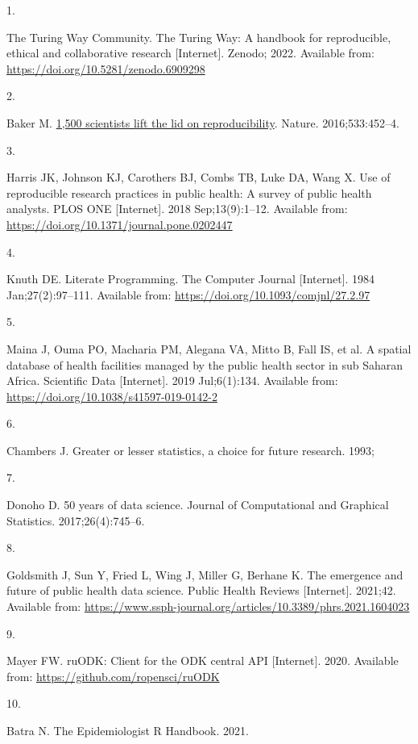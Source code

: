 \documentclass[
  letterpaper,
  DIV=11,
  numbers=noendperiod]{scrreprt}
\newlength{\cslhangindent}
\newlength{\csllabelwidth}
\newlength{\cslentryspacingunit} %
\newenvironment{CSLReferences}[2] %
 {%
  \setlength{\parindent}{0pt}
  \ifodd #1
  \let\oldpar\par
  \def\par{\hangindent=\cslhangindent\oldpar}
  \fi
  \setlength{\parskip}{#2\cslentryspacingunit}
 }%
 {}
\newcommand{\CSLLeftMargin}[1]{\parbox[t]{\csllabelwidth}{#1}}
\newcommand{\CSLRightInline}[1]{\parbox[t]{\linewidth - \csllabelwidth}{#1}\break}
\begin{document}
\hypertarget{refs}{}
\begin{CSLReferences}{0}{0}
\leavevmode{}%
\CSLLeftMargin{1. }%
\CSLRightInline{The Turing Way Community. {The Turing Way: A handbook
for reproducible, ethical and collaborative research} {[}Internet{]}.
Zenodo; 2022. Available from:
\url{https://doi.org/10.5281/zenodo.6909298}}

\leavevmode{}%
\CSLLeftMargin{2. }%
\CSLRightInline{Baker M. \href{https://doi.org/10.1038/533452a}{1,500
scientists lift the lid on reproducibility}. Nature. 2016;533:452--4. }

\leavevmode{}%
\CSLLeftMargin{3. }%
\CSLRightInline{Harris JK, Johnson KJ, Carothers BJ, Combs TB, Luke DA,
Wang X. Use of reproducible research practices in public health: {A}
survey of public health analysts. PLOS ONE {[}Internet{]}. 2018
Sep;13(9):1--12. Available from:
\url{https://doi.org/10.1371/journal.pone.0202447}}

\leavevmode{}%
\CSLLeftMargin{4. }%
\CSLRightInline{Knuth DE. {Literate Programming}. The Computer Journal
{[}Internet{]}. 1984 Jan;27(2):97--111. Available from:
\url{https://doi.org/10.1093/comjnl/27.2.97}}

\leavevmode{}%
\CSLLeftMargin{5. }%
\CSLRightInline{Maina J, Ouma PO, Macharia PM, Alegana VA, Mitto B, Fall
IS, et al. A spatial database of health facilities managed by the public
health sector in sub {Saharan} {Africa}. Scientific Data {[}Internet{]}.
2019 Jul;6(1):134. Available from:
\url{https://doi.org/10.1038/s41597-019-0142-2}}

\leavevmode{}%
\CSLLeftMargin{6. }%
\CSLRightInline{Chambers J. Greater or lesser statistics, a choice for
future research. 1993; }

\leavevmode{}%
\CSLLeftMargin{7. }%
\CSLRightInline{Donoho D. 50 years of data science. Journal of
Computational and Graphical Statistics. 2017;26(4):745--6. }

\leavevmode{}%
\CSLLeftMargin{8. }%
\CSLRightInline{Goldsmith J, Sun Y, Fried L, Wing J, Miller G, Berhane
K. The emergence and future of public health data science. Public Health
Reviews {[}Internet{]}. 2021;42. Available from:
\url{https://www.ssph-journal.org/articles/10.3389/phrs.2021.1604023}}

\leavevmode{}%
\CSLLeftMargin{9. }%
\CSLRightInline{Mayer FW. ruODK: Client for the ODK central API
{[}Internet{]}. 2020. Available from:
\url{https://github.com/ropensci/ruODK}}

\leavevmode{}%
\CSLLeftMargin{10. }%
\CSLRightInline{Batra N. {The Epidemiologist R Handbook}. 2021. }

\end{CSLReferences}
\end{document}
